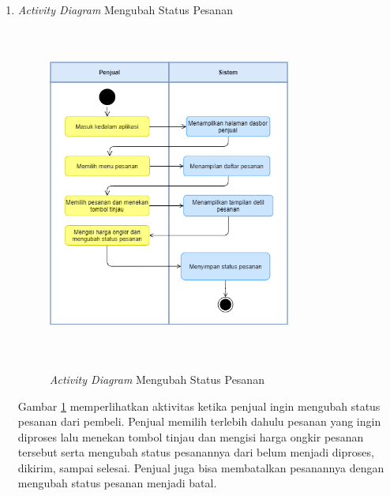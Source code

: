 \begin{enumerate}
	\item \textit{Activity Diagram} Mengubah Status Pesanan
	\begin{figure}[H]
		\centering
		{\includegraphics [width = 8cm, height= 11cm]{gambar/activity diagram/ubah status pesanan}}
		\caption{\textit{Activity Diagram} Mengubah Status Pesanan}
		\label{ubah status pesanan}
	\end{figure}
	\par Gambar \ref*{ubah status pesanan} memperlihatkan aktivitas ketika penjual ingin mengubah status pesanan dari pembeli. Penjual memilih terlebih dahulu pesanan yang ingin diproses lalu menekan tombol tinjau dan mengisi harga ongkir pesanan tersebut serta mengubah status pesanannya dari belum menjadi diproses, dikirim, sampai selesai. Penjual juga bisa membatalkan pesanannya dengan mengubah status pesanan menjadi batal.


\end{enumerate}
